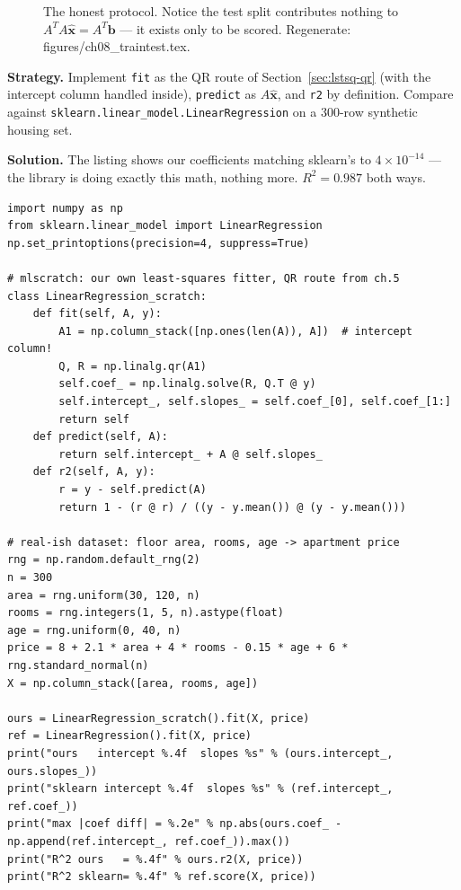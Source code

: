 \begin{figure}[htbp]
\centering

\caption{The honest protocol. Notice the test split contributes nothing
to $A^{T}A\hat{\mathbf x}=A^{T}\mathbf b$ --- it exists only to be scored.
Regenerate: \ttfamily figures/ch08\_traintest.tex.}
\label{fig:traintest}
\end{figure}

\begin{example}\label{ex:capstone}
\textbf{Strategy.} Implement \texttt{fit} as the QR route of
Section~\ref{sec:lstsq-qr} (with the intercept column handled inside),
\texttt{predict} as $A\hat{\mathbf x}$, and \texttt{r2} by definition.
Compare against \texttt{sklearn.linear\_model.LinearRegression} on a
300-row synthetic housing set.

\textbf{Solution.} The listing shows our coefficients matching sklearn's
to $4\times10^{-14}$ --- the library is doing exactly this math, nothing
more. $R^{2}=0.987$ both ways.
\end{example}

\begin{lstlisting}[caption={\ttfamily code/ch08\_capstone\_linreg.py ---
\texttt{mlscratch} vs.\ \texttt{sklearn}: the whole ``library algorithm''
is the QR solve of this chapter.}]
import numpy as np
from sklearn.linear_model import LinearRegression
np.set_printoptions(precision=4, suppress=True)

# mlscratch: our own least-squares fitter, QR route from ch.5
class LinearRegression_scratch:
    def fit(self, A, y):
        A1 = np.column_stack([np.ones(len(A)), A])  # intercept column!
        Q, R = np.linalg.qr(A1)
        self.coef_ = np.linalg.solve(R, Q.T @ y)
        self.intercept_, self.slopes_ = self.coef_[0], self.coef_[1:]
        return self
    def predict(self, A):
        return self.intercept_ + A @ self.slopes_
    def r2(self, A, y):
        r = y - self.predict(A)
        return 1 - (r @ r) / ((y - y.mean()) @ (y - y.mean()))

# real-ish dataset: floor area, rooms, age -> apartment price
rng = np.random.default_rng(2)
n = 300
area = rng.uniform(30, 120, n)
rooms = rng.integers(1, 5, n).astype(float)
age = rng.uniform(0, 40, n)
price = 8 + 2.1 * area + 4 * rooms - 0.15 * age + 6 * rng.standard_normal(n)
X = np.column_stack([area, rooms, age])

ours = LinearRegression_scratch().fit(X, price)
ref = LinearRegression().fit(X, price)
print("ours   intercept %.4f  slopes %s" % (ours.intercept_, ours.slopes_))
print("sklearn intercept %.4f  slopes %s" % (ref.intercept_, ref.coef_))
print("max |coef diff| = %.2e" % np.abs(ours.coef_ - np.append(ref.intercept_, ref.coef_)).max())
print("R^2 ours   = %.4f" % ours.r2(X, price))
print("R^2 sklearn= %.4f" % ref.score(X, price))
\end{lstlisting}

